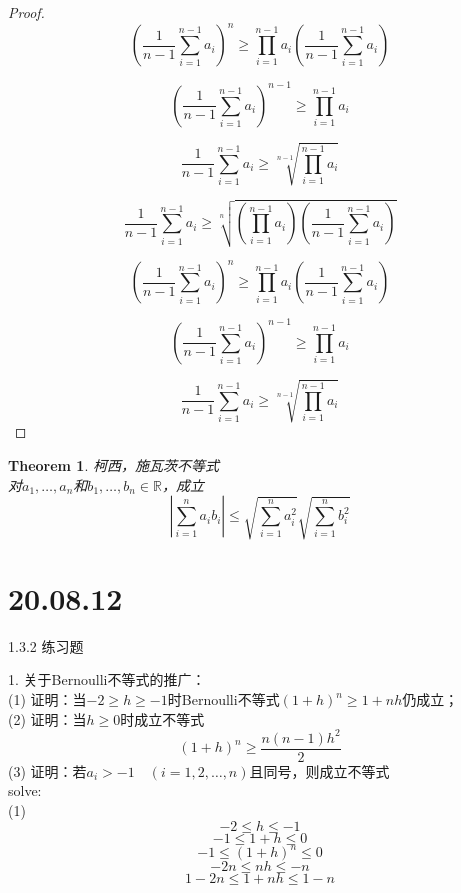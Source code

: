 \documentclass[10pt,a4paper]{book}
\newtheorem{theorem}{Theorem}[section]
\begin{document}
\begin{proof}
	\begin{equation}	
		(\frac{1}{n-1}\sum_{i=1}^{n-1}a_i)^n
		\geq \prod_{i=1}^{n-1}a_i(\frac{1}{n-1}\sum_{i=1}^{n-1}a_i)
	\end{equation}
	

	\begin{equation}	
		(\frac{1}{n-1}\sum_{i=1}^{n-1}a_i)^{n-1}
		\geq \prod_{i=1}^{n-1}a_i
	\end{equation}


	\begin{equation}		
		\frac{1}{n-1}\sum_{i=1}^{n-1}a_i
		\geq \sqrt[n-1]{\prod_{i=1}^{n-1}a_i}
	\end{equation}


	\begin{equation}
		\frac{1}{n-1}\sum_{i=1}^{n-1}a_i \geq \sqrt[n]{(\prod_{i=1}^{n-1}a_i)(\frac{1}{n-1}\sum_{i=1}^{n-1}a_i)}
	\end{equation}
	
	\begin{equation}
		( \frac{1}{n-1}\sum_{i=1}^{n-1}a_i )^n \geq \prod_{i=1}^{n-1}a_i(\frac{1}{n-1}\sum_{i=1}^{n-1}a_i)
	\end{equation}

	\begin{equation}
		( \frac{1}{n-1}\sum_{i=1}^{n-1}a_i )^{n-1} \geq \prod_{i=1}^{n-1}a_i
	\end{equation}
	
	\begin{equation}
		 \frac{1}{n-1}\sum_{i=1}^{n-1}a_i  \geq \sqrt[n-1]{\prod_{i=1}^{n-1}a_i}
	\end{equation}
	
	\end{proof}
	
	\begin{theorem}
		柯西，施瓦茨不等式\\	
		对$ a_1,\dots,a_n $和$ b_1, \dots ,b_n \in \mathbb{R}$，成立
		\begin{equation}
			|\sum_{i=1}^n a_ib_i|\leq \sqrt{\sum_{i=1}^n a_i^2}\sqrt{\sum_{i=1}^n b_i^2}
		\end{equation}
		\label{1.3.5}
	\end{theorem}
	


	\section{20.08.12}
	1.3.2 练习题
	
	1. 关于Bernoulli不等式的推广：
	\\(1) 证明：当$ -2\ge h\ge -1 $时Bernoulli不等式$ (1+h)^n \ge 1+nh $仍成立；\\
	(2) 证明：当$ h\ge 0 $时成立不等式 
	\begin{equation}
		(1+h)^n\ge \frac{n(n-1)h^2}{2}
	\end{equation} 
	(3) 证明：若$ a_i>-1 \quad (i=1,2,\dots,n) $且同号，则成立不等式\\
	solve:\\
	(1)
	\[ -2 \leq h \leq -1 \]
	\[ -1 \leq 1+h \leq 0 \]
	\[ -1 \leq (1+h)^n \leq 0 \]
	\[ -2n \leq nh \leq -n \]
	\[ 1-2n \leq 1+nh \leq 1-n \]
	
\end{document}
